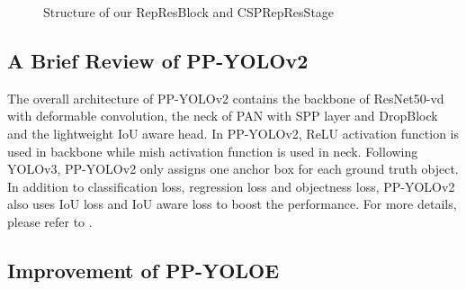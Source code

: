 \documentclass[final]{cvpr}
\begin{document}
\begin{figure*}[ht]
	\centering
	\label{fig:figure2}
	\caption{Structure of our RepResBlock and CSPRepResStage}
\end{figure*}



\subsection{A Brief Review of PP-YOLOv2}

The overall architecture of PP-YOLOv2 contains the backbone of ResNet50-vd\cite{he2019bag} with deformable convolution\cite{zhu2018deformable}, the neck of PAN with SPP layer and DropBlock\cite{ghiasi2018dropblock} and the lightweight IoU aware head. In PP-YOLOv2, ReLU activation function is used in backbone while mish activation function is used in neck. Following YOLOv3, PP-YOLOv2 only assigns one anchor box for each ground truth object. In addition to classification loss, regression loss and objectness loss, PP-YOLOv2 also uses IoU loss and IoU aware loss to boost the performance. For more details, please refer to \cite{huang2021pp-yolov2}. 


\subsection{Improvement of PP-YOLOE}
\end{document}
